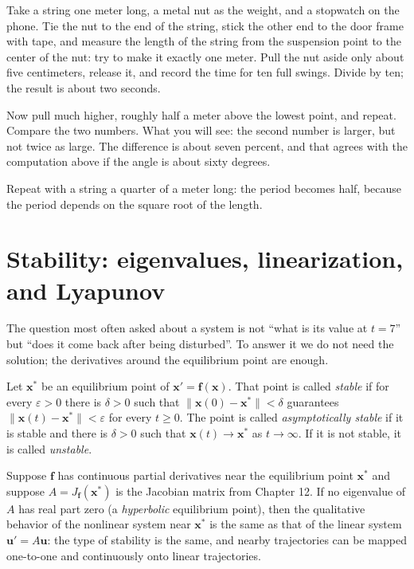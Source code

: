\begin{tangan}
Take a string one meter long, a metal nut as the weight, and a stopwatch on the phone. Tie
the nut to the end of the string, stick the other end to the door frame with tape, and
measure the length of the string from the suspension point to the center of the nut: try to
make it exactly one meter. Pull the nut aside only about five centimeters, release it, and
record the time for ten full swings. Divide by ten; the result is about two seconds.

Now pull much higher, roughly half a meter above the lowest point, and repeat. Compare the
two numbers. What you will see: the second number is larger, but not twice as large. The
difference is about seven percent, and that agrees with the computation above if the angle is
about sixty degrees.

Repeat with a string a quarter of a meter long: the period becomes half, because the period
depends on the square root of the length.
\end{tangan}

\section{Stability: eigenvalues, linearization, and Lyapunov}

The question most often asked about a system is not ``what is its value at $t=7$'' but ``does it
come back after being disturbed''. To answer it we do not need the solution; the derivatives
around the equilibrium point are enough.

\begin{definisi}[Stability]
Let $\mathbf{x}^{*}$ be an equilibrium point of $\mathbf{x}'=\mathbf{f}(\mathbf{x})$.
That point is called \emph{stable} if for every $\varepsilon>0$ there is
$\delta>0$ such that $\|\mathbf{x}(0)-\mathbf{x}^{*}\|<\delta$ guarantees
$\|\mathbf{x}(t)-\mathbf{x}^{*}\|<\varepsilon$ for every $t\ge0$. The point is
called \emph{asymptotically stable} if it is stable and there is $\delta>0$ such that
$\mathbf{x}(t)\to\mathbf{x}^{*}$ as $t\to\infty$. If it is not stable, it is
called \emph{unstable}.
\end{definisi}

\begin{teorema}[Linearization]
Suppose $\mathbf{f}$ has continuous partial derivatives near the equilibrium point
$\mathbf{x}^{*}$ and suppose $A=J_{\mathbf{f}}(\mathbf{x}^{*})$ is the Jacobian matrix from
Chapter 12. If no eigenvalue of $A$ has real part zero (a \emph{hyperbolic} equilibrium
point), then the qualitative behavior of the nonlinear system near $\mathbf{x}^{*}$ is the
same as that of the linear system $\mathbf{u}'=A\mathbf{u}$: the type of stability is the
same, and nearby trajectories can be mapped one-to-one and continuously onto linear
trajectories.
\end{teorema}

